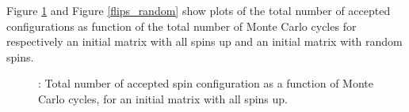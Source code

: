 \documentclass{article}
\begin{document}
{{		Figure \ref{fig:flips} and Figure \ref{flips_random} show plots of the total number of accepted configurations as function of the total number of Monte Carlo cycles for respectively an initial matrix with all spins up and an initial matrix with random spins.

		\begin{figure}[H]
		\caption{: Total number of accepted spin configuration as a function of Monte Carlo cycles, for an initial matrix with all spins up. }
		\label{fig:flips}
		\end{figure}

}}
\end{document}
